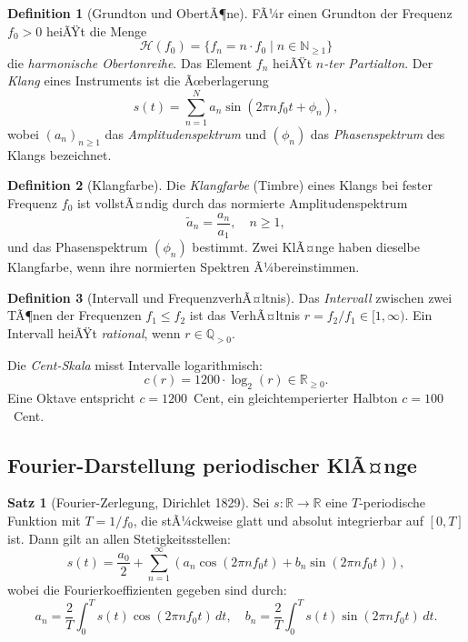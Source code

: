 ﻿\documentclass[a4paper,12pt]{article}
\theoremstyle{definition}
\newtheorem{definition}{Definition}
\newtheorem{satz}{Satz}
\begin{document}
\begin{definition}[Grundton und ObertÃ¶ne]
FÃ¼r einen Grundton der Frequenz $f_0 > 0$ heiÃŸt die Menge
\[
\mathcal{H}(f_0) = \{f_n = n \cdot f_0 \mid n \in \mathbb{N}_{\geq 1}\}
\]
die \emph{harmonische Obertonreihe}. Das Element $f_n$ heiÃŸt \emph{$n$-ter Partialton}.
Der \emph{Klang} eines Instruments ist die Ãœberlagerung
\[
s(t) = \sum_{n=1}^{N} a_n \sin(2\pi n f_0 t + \phi_n),
\]
wobei $(a_n)_{n \geq 1}$ das \emph{Amplitudenspektrum} und $(\phi_n)$ das
\emph{Phasenspektrum} des Klangs bezeichnet.
\end{definition}

\begin{definition}[Klangfarbe]
Die \emph{Klangfarbe} (Timbre) eines Klangs bei fester Frequenz $f_0$ ist
vollstÃ¤ndig durch das normierte Amplitudenspektrum
\[
\tilde{a}_n = \frac{a_n}{a_1}, \quad n \geq 1,
\]
und das Phasenspektrum $(\phi_n)$ bestimmt. Zwei KlÃ¤nge haben dieselbe Klangfarbe,
wenn ihre normierten Spektren Ã¼bereinstimmen.
\end{definition}

\begin{definition}[Intervall und FrequenzverhÃ¤ltnis]
Das \emph{Intervall} zwischen zwei TÃ¶nen der Frequenzen $f_1 \leq f_2$ ist das
VerhÃ¤ltnis $r = f_2/f_1 \in [1, \infty)$. Ein Intervall heiÃŸt \emph{rational},
wenn $r \in \mathbb{Q}_{>0}$.

Die \emph{Cent-Skala} misst Intervalle logarithmisch:
\[
c(r) = 1200 \cdot \log_2(r) \in \mathbb{R}_{\geq 0}.
\]
Eine Oktave entspricht $c = 1200$~Cent, ein gleichtemperierter Halbton $c = 100$~Cent.
\end{definition}

\subsection{Fourier-Darstellung periodischer KlÃ¤nge}

\begin{satz}[Fourier-Zerlegung, Dirichlet 1829]
\label{satz:fourier}
Sei $s: \mathbb{R} \to \mathbb{R}$ eine $T$-periodische Funktion mit
$T = 1/f_0$, die stÃ¼ckweise glatt und absolut integrierbar auf $[0, T]$ ist.
Dann gilt an allen Stetigkeitsstellen:
\[
s(t) = \frac{a_0}{2} + \sum_{n=1}^{\infty} \left(a_n \cos(2\pi n f_0 t)
+ b_n \sin(2\pi n f_0 t)\right),
\]
wobei die Fourierkoeffizienten gegeben sind durch:
\[
a_n = \frac{2}{T}\int_0^T s(t)\cos(2\pi n f_0 t)\,dt, \quad
b_n = \frac{2}{T}\int_0^T s(t)\sin(2\pi n f_0 t)\,dt.
\]
\end{satz}
\end{document}
